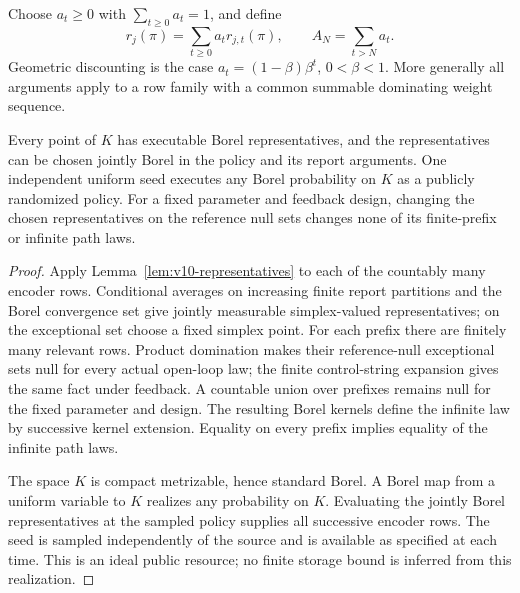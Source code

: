 Choose $a_t\ge0$ with $\sum_{t\ge0}a_t=1$, and define
\begin{equation}
 r_j(\pi)=\sum_{t\ge0}a_t r_{j,t}(\pi),\qquad
 A_N=\sum_{t>N}a_t.
 \label{eq:v12-tail}
\end{equation}
Geometric discounting is the case $a_t=(1-\beta)\beta^t$, $0<\beta<1$.
More generally all arguments apply to a row family with a common
summable dominating weight sequence.

\begin{lemma}
\label{lem:v12-executable}
Every point of $K$ has executable Borel representatives, and the
representatives can be chosen jointly Borel in the policy and its report
arguments. One independent uniform seed executes any Borel probability
on $K$ as a publicly randomized policy. For a fixed parameter and
feedback design, changing the chosen representatives on the reference
null sets changes none of its finite-prefix or infinite path laws.
\end{lemma}

\begin{proof}
Apply Lemma~\ref{lem:v10-representatives} to each of the countably many
encoder rows. Conditional averages on increasing finite report partitions
and the Borel convergence set give jointly measurable simplex-valued
representatives; on the exceptional set choose a fixed simplex point.
For each prefix there are finitely many relevant rows. Product domination
makes their reference-null exceptional sets null for every actual
open-loop law; the finite control-string expansion gives the same fact
under feedback. A countable union over prefixes remains null for the
fixed parameter and design. The resulting Borel kernels define the
infinite law by successive kernel extension. Equality on every prefix
implies equality of the infinite path laws.

The space $K$ is compact metrizable, hence standard Borel. A Borel map
from a uniform variable to $K$ realizes any probability on $K$. Evaluating
the jointly Borel representatives at the sampled policy supplies all
successive encoder rows. The seed is sampled independently of the source
and is available as specified at each time. This is an ideal public
resource; no finite storage bound is inferred from this realization.
\end{proof}


